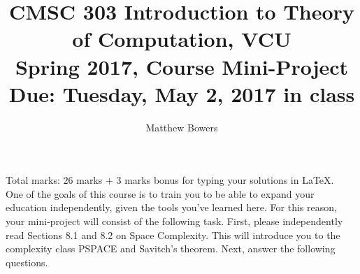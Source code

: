 \documentclass{article}
\author{Matthew Bowers}
\begin{document}
\title{CMSC 303 Introduction to Theory of Computation, VCU\\Spring 2017, Course Mini-Project\\Due: Tuesday, May 2, 2017 in class}
\date{}
\maketitle
\vspace{-5mm}
\noindent Total marks: $26$ marks + $3$ marks bonus for typing your solutions in LaTeX.\vspace{2mm}\\

One of the goals of this course is to train you to be able to expand your education independently, given the tools you've learned here. For this reason, your mini-project will consist of the following task. First, please independently read Sections 8.1 and 8.2 on Space Complexity. This will introduce you to the complexity class PSPACE and Savitch's theorem. Next, answer the following questions.
\end{document}
